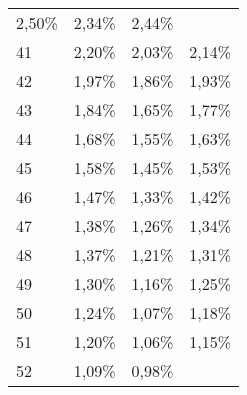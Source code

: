 \begin{tabular}{llll}
  \multicolumn{1}{|r}{2,50\%} &
  \multicolumn{1}{r}{2,34\%} &
  \multicolumn{1}{r}{2,44\%} \\
\multicolumn{1}{l}{\hspace{1em}41} &
  \multicolumn{1}{|r}{2,20\%} &
  \multicolumn{1}{r}{2,03\%} &
  \multicolumn{1}{r}{2,14\%} \\
\multicolumn{1}{l}{\hspace{1em}42} &
  \multicolumn{1}{|r}{1,97\%} &
  \multicolumn{1}{r}{1,86\%} &
  \multicolumn{1}{r}{1,93\%} \\
\multicolumn{1}{l}{\hspace{1em}43} &
  \multicolumn{1}{|r}{1,84\%} &
  \multicolumn{1}{r}{1,65\%} &
  \multicolumn{1}{r}{1,77\%} \\
\multicolumn{1}{l}{\hspace{1em}44} &
  \multicolumn{1}{|r}{1,68\%} &
  \multicolumn{1}{r}{1,55\%} &
  \multicolumn{1}{r}{1,63\%} \\
\multicolumn{1}{l}{\hspace{1em}45} &
  \multicolumn{1}{|r}{1,58\%} &
  \multicolumn{1}{r}{1,45\%} &
  \multicolumn{1}{r}{1,53\%} \\
\multicolumn{1}{l}{\hspace{1em}46} &
  \multicolumn{1}{|r}{1,47\%} &
  \multicolumn{1}{r}{1,33\%} &
  \multicolumn{1}{r}{1,42\%} \\
\multicolumn{1}{l}{\hspace{1em}47} &
  \multicolumn{1}{|r}{1,38\%} &
  \multicolumn{1}{r}{1,26\%} &
  \multicolumn{1}{r}{1,34\%} \\
\multicolumn{1}{l}{\hspace{1em}48} &
  \multicolumn{1}{|r}{1,37\%} &
  \multicolumn{1}{r}{1,21\%} &
  \multicolumn{1}{r}{1,31\%} \\
\multicolumn{1}{l}{\hspace{1em}49} &
  \multicolumn{1}{|r}{1,30\%} &
  \multicolumn{1}{r}{1,16\%} &
  \multicolumn{1}{r}{1,25\%} \\
\multicolumn{1}{l}{\hspace{1em}50} &
  \multicolumn{1}{|r}{1,24\%} &
  \multicolumn{1}{r}{1,07\%} &
  \multicolumn{1}{r}{1,18\%} \\
\multicolumn{1}{l}{\hspace{1em}51} &
  \multicolumn{1}{|r}{1,20\%} &
  \multicolumn{1}{r}{1,06\%} &
  \multicolumn{1}{r}{1,15\%} \\
\multicolumn{1}{l}{\hspace{1em}52} &
  \multicolumn{1}{|r}{1,09\%} &
  \multicolumn{1}{r}{0,98\%} &

\end{tabular}
